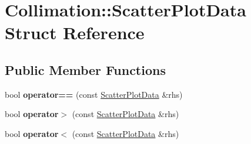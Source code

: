 \hypertarget{structCollimation_1_1ScatterPlotData}{}\section{Collimation\+:\+:Scatter\+Plot\+Data Struct Reference}
\label{structCollimation_1_1ScatterPlotData}
\subsection*{Public Member Functions}
\begin{DoxyCompactItemize}
\item 
\mbox{\label{structCollimation_1_1ScatterPlotData_aad5babe3f387da1817b594fe64438591}} 
bool {\bfseries operator==} (const \hyperlink{structCollimation_1_1ScatterPlotData}{Scatter\+Plot\+Data} \&rhs)
\item 
\mbox{\label{structCollimation_1_1ScatterPlotData_ab7a6f29c75d27551924617d44b41ca39}} 
bool {\bfseries operator$>$} (const \hyperlink{structCollimation_1_1ScatterPlotData}{Scatter\+Plot\+Data} \&rhs)
\item 
\mbox{\label{structCollimation_1_1ScatterPlotData_a7d1a5af4e9adcf82e3729c8c160a1dcf}} 
bool {\bfseries operator$<$} (const \hyperlink{structCollimation_1_1ScatterPlotData}{Scatter\+Plot\+Data} \&rhs)
\end{DoxyCompactItemize}
